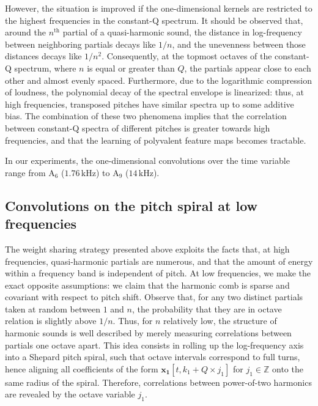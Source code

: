 \documentclass{article}
\begin{document}
However, the situation is improved if the one-dimensional
kernels are restricted to the highest frequencies in the constant-Q spectrum.
It should be observed that, around the $n^{\textrm{th}}$ partial of a quasi-harmonic sound,
the distance in log-frequency between neighboring partials decays like $1/n$,
and the unevenness between those distances decays like $1/n^2$.
Consequently, at the topmost octaves of the constant-Q spectrum,
where $n$ is equal or greater than $Q$, the partials appear close to each other and almost
evenly spaced.
Furthermore, due to the logarithmic compression of loudness, the polynomial decay
of the spectral envelope is linearized: thus, at high frequencies, transposed pitches
have similar spectra up to some additive bias.
The combination of these two phenomena implies that the correlation between
constant-Q spectra of different pitches is greater towards high frequencies, and that
the learning of polyvalent feature maps becomes tractable.


In our experiments, the one-dimensional convolutions over the time variable
range from
$\mathrm{A_6}$ ($1.76\,\mathrm{kHz}$) to
$\mathrm{A_9}$ ($14\,\mathrm{kHz}$).

\subsection{Convolutions on the pitch spiral at low frequencies}
The weight sharing strategy presented above exploits the facts that,
at high frequencies, quasi-harmonic partials are numerous, and that the
amount of energy within a frequency band is independent of pitch.
At low frequencies, we make the exact opposite assumptions: we claim
that the harmonic comb is sparse and covariant with respect to pitch shift.
Observe that, for any two distinct partials taken at random between $1$ and $n$,
the probability that they are in octave relation is slightly above $1/n$.
Thus, for $n$ relatively low, the structure of harmonic sounds is well
described by merely measuring correlations between partials one octave apart.
This idea consists in rolling up the log-frequency axis into a Shepard pitch spiral,
such that octave intervals correspond to full turns, hence aligning all coefficients
of the form $\boldsymbol{x_1}[t, k_1 + Q \times j_1]$ for $j_1 \in \mathbb{Z}$
onto the same radius of the spiral.
Therefore, correlations between power-of-two harmonics are revealed by
the octave variable $j_1$.
\end{document}

